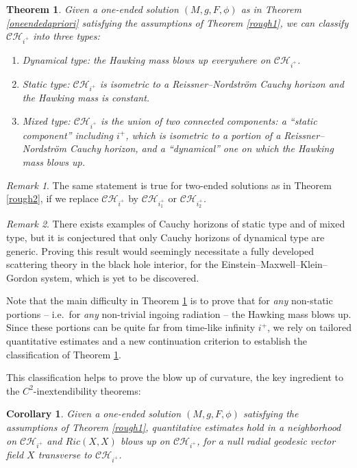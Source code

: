 \documentclass[10pt,a4paper]{article}
\theoremstyle{plain}
\newtheorem*{cor*}{Corollary}
\newtheorem{theo}{Theorem}
\theoremstyle{remark}
\newtheorem{rmk}{Remark}[section]
\theoremstyle{definition}
\theoremstyle{plain}
\theoremstyle{remark}
\theoremstyle{definition}
\newcommand{\CH}{\mathcal{CH}_{i^+}}
\newcommand{\CHone}{\mathcal{CH}_{i^+_1}}
\newcommand{\CHtwo}{\mathcal{CH}_{i^+_2}}
\numberwithin{equation}{section}
\begin{document}
 \begin{theo} \label{classificationrough}
 	Given a one-ended solution $(M,g,F,\phi)$ as in Theorem \ref{oneendedapriori} satisfying the assumptions of Theorem \ref{rough1}, we can classify $\CH$ into three types: \begin{enumerate}
 		\item Dynamical type: the Hawking mass blows up everywhere on $\CH$.
 		\item Static type: $\CH$ is isometric to a Reissner--Nordstr\"{o}m Cauchy horizon and the Hawking mass is constant.
 		\item Mixed type: $\CH$ is the union of two connected components: a ``static component'' including $i^+$, which is isometric to a portion of a Reissner--Nordstr\"{o}m Cauchy horizon, and a ``dynamical'' one on which the Hawking mass blows up.
 	\end{enumerate}
 \end{theo}
 \begin{rmk}
 	The same statement is true for two-ended solutions as in Theorem \ref{rough2}, if we replace $\CH$ by $\CHone$ or $\CHtwo$.   
 \end{rmk}
 \begin{rmk}
 	There exists examples of Cauchy horizons of static type and of mixed type, but it is conjectured that only Cauchy horizons of dynamical type are generic. Proving this result would seemingly necessitate a fully developed scattering theory in the black hole interior, for the Einstein--Maxwell--Klein--Gordon system, which is yet to be discovered.
 \end{rmk}
 
 Note that the main difficulty in Theorem \ref{classificationrough} is to prove that for \textit{any} non-static portions -- i.e.\ for \textit{any} non-trivial ingoing radiation -- the Hawking mass blows up. Since these portions can be quite far from time-like infinity $i^+$, we rely on tailored quantitative estimates and a new continuation criterion to establish the classification of Theorem \ref{classificationrough}.
 
 This classification helps to prove the blow up of curvature, the key ingredient to the $C^2$-inextendibility theorems:
 
 \begin{cor*}
 	Given a one-ended solution $(M,g,F,\phi)$ satisfying the assumptions of Theorem \ref{rough1}, quantitative estimates hold in a neighborhood on $\CH$ and $Ric(X,X)$ blows up on $\CH$, for a null radial geodesic vector field $X$ transverse to $\CH$.
 \end{cor*}
\end{document}
